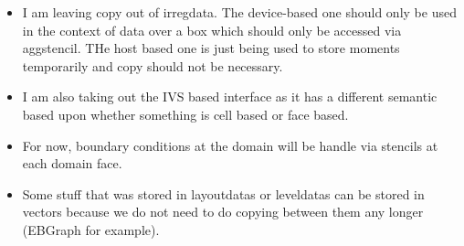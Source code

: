 \begin{itemize}
\item I am leaving copy out of irregdata.   The device-based one
  should only be used in the context of data over a box which should
  only be accessed via aggstencil.   THe host based one is just being
  used to store moments temporarily and copy should not be necessary.

\item I am also taking out the IVS based interface as it has a
  different semantic  based upon whether something is cell based or
  face based.

\item For now, boundary conditions at the domain will be handle via
  stencils at each domain face.

\item Some stuff that was stored in layoutdatas or leveldatas can be
  stored in vectors because we do not need to do copying between them
  any longer (EBGraph for example).
\end{itemize}
